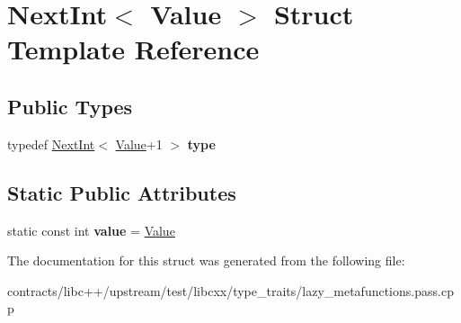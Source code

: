 \hypertarget{struct_next_int}{}\section{Next\+Int$<$ Value $>$ Struct Template Reference}
\label{struct_next_int}
\subsection*{Public Types}
\begin{DoxyCompactItemize}
\item 
\mbox{\label{struct_next_int_a2d6d169fb42ba1768c7a4ada88e5b7ad}} 
typedef \mbox{\hyperlink{struct_next_int}{Next\+Int}}$<$ \mbox{\hyperlink{struct_value}{Value}}+1 $>$ {\bfseries type}
\end{DoxyCompactItemize}
\subsection*{Static Public Attributes}
\begin{DoxyCompactItemize}
\item 
\mbox{\label{struct_next_int_a2bc9981ec1d3c29a15fe5c55a8ca2087}} 
static const int {\bfseries value} = \mbox{\hyperlink{struct_value}{Value}}
\end{DoxyCompactItemize}


The documentation for this struct was generated from the following file\+:\begin{DoxyCompactItemize}
\item 
contracts/libc++/upstream/test/libcxx/type\+\_\+traits/lazy\+\_\+metafunctions.\+pass.\+cpp\end{DoxyCompactItemize}
